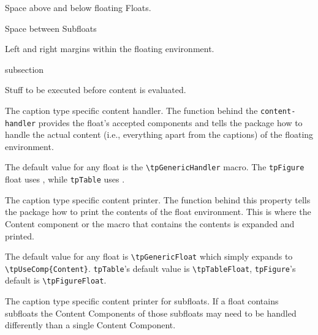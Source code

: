 Space above and below floating Floats.


Space between Subfloats


Left and right margins within the floating environment.


\begin{heading}[label=sec:flt:comp]{subsection}
\end{heading}


Stuff to be executed before content is evaluated.


The caption type specific content handler. The function behind the
\lstinline{content-handler} provides the float's accepted components
and tells the package how to handle the actual content (i.e.,
everything apart from the captions) of the floating environment.

The default value for any float is the \lstinline{\tpGenericHandler}
macro. The \lstinline{tpFigure} float uses
\texttt{\string\tpFigureHandler}, while \lstinline{tpTable} uses
\texttt{\string\tpTableHandler}.


The caption type specific content printer. The function behind this
property tells the package how to print the contents of the float
environment. This is where the Content component or the macro that
contains the contents is expanded and printed.

The default value for any float is \lstinline{\tpGenericFloat} which
simply expands to
\lstinline|\tpUseComp{Content}|. \lstinline{tpTable}'s default value
is \lstinline{\tpTableFloat}, \lstinline{tpFigure}'s default is
\lstinline{\tpFigureFloat}.


The caption type specific content printer for subfloats. If a float
contains subfloats the Content Components of those subfloats may need
to be handled differently than a single Content Component.

